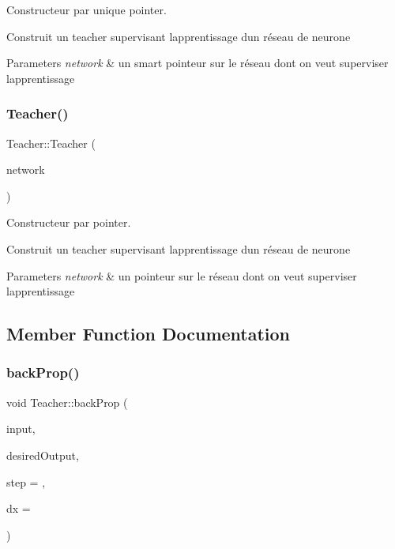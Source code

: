 Constructeur par unique pointer. 

Construit un teacher supervisant l\textquotesingle{}apprentissage d\textquotesingle{}un réseau de neurone 
\begin{DoxyParams}{Parameters}
{\em network} & un smart pointeur sur le réseau dont on veut superviser l\textquotesingle{}apprentissage \\
\hline
\end{DoxyParams}
\mbox{\label{classTeacher_afd32ab70242f2c5886d030a5e7d05919}} 
\subsubsection{\texorpdfstring{Teacher()}{Teacher()}\hspace{0.1cm}{\footnotesize\ttfamily [2/2]}}
{\footnotesize\ttfamily Teacher\+::\+Teacher (\begin{DoxyParamCaption}\item[{\hyperlink{classNeuralNetwork}{Neural\+Network} $\ast$}]{network }\end{DoxyParamCaption})}



Constructeur par pointer. 

Construit un teacher supervisant l\textquotesingle{}apprentissage d\textquotesingle{}un réseau de neurone 
\begin{DoxyParams}{Parameters}
{\em network} & un pointeur sur le réseau dont on veut superviser l\textquotesingle{}apprentissage \\
\hline
\end{DoxyParams}


\subsection{Member Function Documentation}
\mbox{\label{classTeacher_a99fc69c5319be890394d2c8503e217c8}} 
\subsubsection{\texorpdfstring{back\+Prop()}{backProp()}}
{\footnotesize\ttfamily void Teacher\+::back\+Prop (\begin{DoxyParamCaption}\item[{Eigen\+::\+Vector\+Xf}]{input,  }\item[{Eigen\+::\+Vector\+Xf}]{desired\+Output,  }\item[{float}]{step = {},  }\item[{float}]{dx = {} }\end{DoxyParamCaption})}



